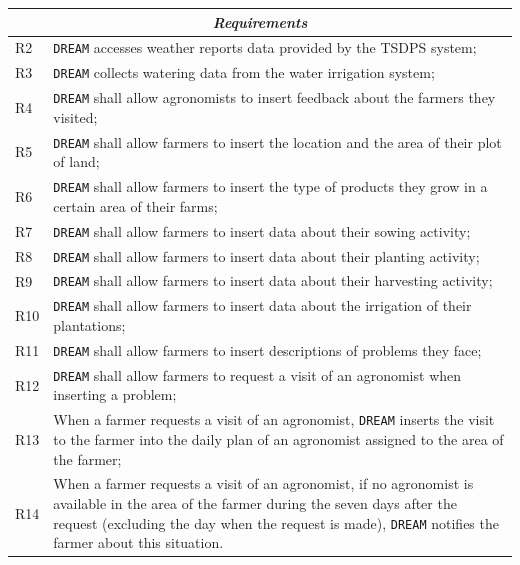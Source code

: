 \documentclass{article}
\begin{document}
\begin{longtable}[c]{|m{0.75cm}|m{11cm}|}
 \hline
 \multicolumn{2}{|c|}{\cellcolor{white}\textbf{\emph{Requirements}}}
 \endfirsthead
 \endhead
 \endfoot
 \endlastfoot
  \hline
  R1\label{R} & \verb|DREAM| collects soil moisture data from the soil moisture sensors;\\
  \hline
  R2\label{R} & \verb|DREAM| accesses weather reports data provided by the TSDPS system;\\
  \hline
  R3\label{R} & \verb|DREAM| collects watering data from the water irrigation system;\\
  \hline
R4\label{R} & \verb|DREAM| shall allow agronomists to insert feedback about the farmers they visited;\\
  \hline
R5\label{R} & \verb|DREAM| shall allow farmers to insert the location and the area of their plot of land;\\
\hline
R6\label{R} & \verb|DREAM| shall allow farmers to insert the type of products they grow in a certain area of their farms;\\
\hline
R7\label{R} & \verb|DREAM| shall allow farmers to insert data about their sowing activity;\\
\hline
R8\label{R} & \verb|DREAM| shall allow farmers to insert data about their planting activity;\\
  \hline
  R9\label{R} & \verb|DREAM| shall allow farmers to insert data about their harvesting activity;\\
  \hline
  R10\label{R} & \verb|DREAM| shall allow farmers to insert data about the irrigation of their plantations;\\
  \hline
  R11\label{R} & \verb|DREAM| shall allow farmers to insert descriptions of problems they face;\\
  \hline
  R12\label{R} & \verb|DREAM| shall allow farmers to request a visit of an agronomist when inserting a problem;\\
  \hline
  R13\label{R} & When a farmer requests a visit of an agronomist, \verb|DREAM| inserts the visit to the farmer into the daily plan of an agronomist assigned to the area of the farmer;\\
  \hline
  R14\label{R} & When a farmer requests a visit of an agronomist, if no agronomist is available in the area of the farmer during the seven days after the request (excluding the day when the request is made), \verb|DREAM| notifies the farmer about this situation.\\

\end{longtable}
\end{document}
